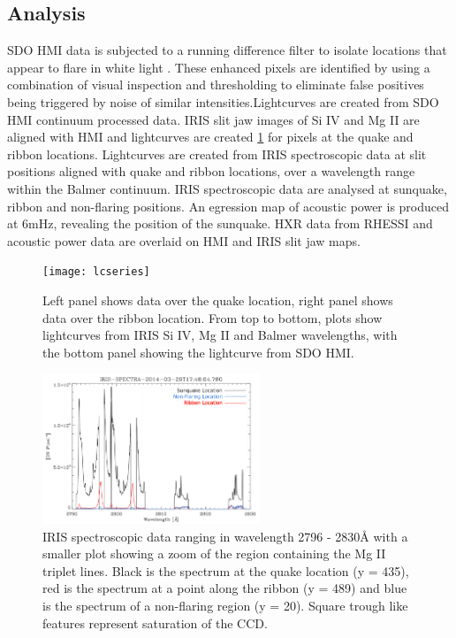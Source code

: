 \subsection{Analysis}
SDO HMI data is subjected to a running difference filter to isolate locations that appear to flare in white light . These enhanced pixels are identified by using a combination of visual inspection and thresholding to eliminate false positives being triggered by noise of similar intensities.Lightcurves are created from SDO HMI continuum processed data. IRIS slit jaw images of Si IV and Mg II are aligned with HMI and lightcurves are created \ref{lcseries} for pixels at the quake and ribbon locations. Lightcurves are created from IRIS spectroscopic data at slit positions aligned with quake and ribbon locations, over a wavelength range within the Balmer continuum. IRIS spectroscopic data are analysed at sunquake, ribbon and non-flaring positions. An egression map of acoustic power is produced  at 6mHz, revealing the position of the sunquake. HXR data from RHESSI and acoustic power data are overlaid on HMI and IRIS slit jaw maps.\\

\begin{figure}\label{lcseries}
  \begin{center} 
\texttt{[image: lcseries]}
  \end{center}
  \caption{Left panel shows data over the quake location, right panel shows data over the ribbon location. From top to bottom, plots show lightcurves from IRIS Si IV, Mg II and Balmer wavelengths, with the bottom panel showing the lightcurve from SDO HMI. }
\end{figure}

\begin{figure}\label{spectra}
  \begin{center}
  \includegraphics[width=0.58\textwidth]{spectra}
  \end{center}
  \caption{IRIS spectroscopic data ranging in wavelength 2796 - 2830Å with a smaller plot showing a zoom of the region containing the Mg II triplet lines. Black is the spectrum at the quake location (y = 435), red is the spectrum at a point along the ribbon (y = 489) and blue is the spectrum of a non-flaring region (y = 20). Square trough like features represent saturation of the CCD.}
\end{figure}
 

